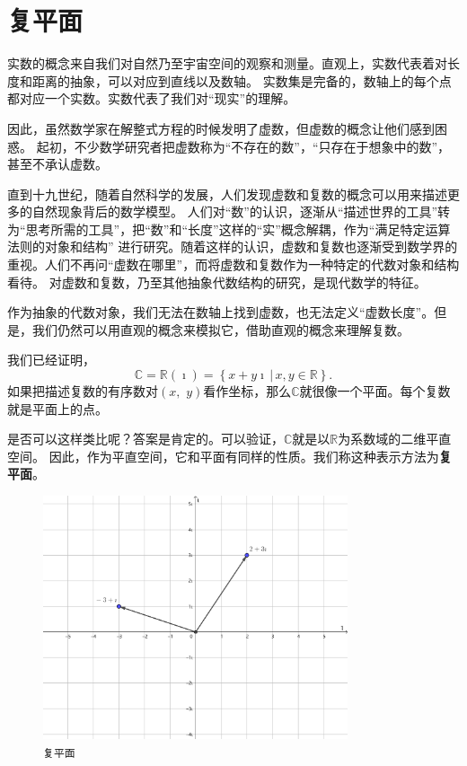 \documentclass[12pt,UTF8]{ctexbook}
\theoremstyle{definition}
\theoremstyle{plain}
\begin{document}
\section{复平面}

实数的概念来自我们对自然乃至宇宙空间的观察和测量。直观上，实数代表着对长度和距离的抽象，可以对应到直线以及数轴。
实数集是完备的，数轴上的每个点都对应一个实数。实数代表了我们对“现实”的理解。

因此，虽然数学家在解整式方程的时候发明了虚数，但虚数的概念让他们感到困惑。
起初，不少数学研究者把虚数称为“不存在的数”，“只存在于想象中的数”，甚至不承认虚数。

直到十九世纪，随着自然科学的发展，人们发现虚数和复数的概念可以用来描述更多的自然现象背后的数学模型。
人们对“数”的认识，逐渐从“描述世界的工具”转为“思考所需的工具”，把“数”和“长度”这样的“实”概念解耦，作为“满足特定运算法则的对象和结构”
进行研究。随着这样的认识，虚数和复数也逐渐受到数学界的重视。人们不再问“虚数在哪里”，而将虚数和复数作为一种特定的代数对象和结构看待。
对虚数和复数，乃至其他抽象代数结构的研究，是现代数学的特征。

作为抽象的代数对象，我们无法在数轴上找到虚数，也无法定义“虚数长度”。但是，我们仍然可以用直观的概念来模拟它，借助直观的概念来理解复数。

我们已经证明，
$$\mathbb{C} = \mathbb{R}(\imath) = \left\{\left. x + y\imath \, \right| \, x, y \in \mathbb{R} \right\}. $$
如果把描述复数的有序数对$(x,\,\,y)$看作坐标，那么$\mathbb{C}$就很像一个平面。每个复数就是平面上的点。

是否可以这样类比呢？答案是肯定的。可以验证，$\mathbb{C}$就是以$\mathbb{R}$为系数域的二维平直空间。
因此，作为平直空间，它和平面有同样的性质。我们称这种表示方法为\textbf{复平面}。

\begin{figure}[h] 
    \centering
    \includegraphics[width=0.8\textwidth]{tu/复平面1.png}
    \caption*{\texttt{复平面}}
\end{figure}
\end{document}
